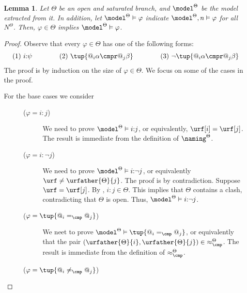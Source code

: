 \documentclass[10pt,a4paper]{amsart}
\newtheorem{lem}[thm]{Lemma}
\theoremstyle{definition}
\theoremstyle{remark}
\begin{document}
\begin{lem}\label{prop:truthlemma}
    Let $\Theta$ be an open and saturated branch, and $\model^{\Theta}$ be the model extracted from it. 
    In addition, let $\model^{\Theta} \vDash \varphi$ indicate $\model^{\Theta}, n \vDash \varphi$ for all $N^{\Theta}$.
    Then, $\varphi \in \Theta$ implies $\model^{\Theta} \vDash \varphi$.
\end{lem}
\begin{proof}
    Observe that every $\varphi \in \Theta$ has one of the following forms: 
    \[
        (1)~i{:}\psi \qquad\qquad
        (2)~\tup{@_i \alpha \cmpr @_j\beta } \qquad\qquad
        (3)~\lnot\tup{@_i \alpha \cmpr @_j\beta }
    \]
    The proof is by induction on the size of $\varphi \in \Theta$.
    We focus on some of the cases in the proof.
    \begin{description}
        \item[\textnormal{For the base cases we consider}] \hfill
            \begin{description}
                \item[($\varphi = i{:}j$)] 
                    We need to prove $\model^\Theta \vDash i{:}j$, or equivalently, $\urf[i] = \urf[j]$.
                    The result is immediate from the definition of $\naming^{\Theta}$.
                \item[($\varphi = i{:}\lnot j$)]
                    We need to prove $\model^\Theta \vDash i{:}\lnot j$, or equivalently $\urf \neq \urfather{\Theta}{j}$.
                    The proof is by contradiction.
                    Suppose $\urf = \urf[j]$.
                    By , $i{:}j \in \Theta$.
                    This implies that $\Theta$ contains a clash, contradicting that $\Theta$ is open. Thus, $\model^\Theta \vDash i{:}\lnot j$. 
                \item[($\varphi = \tup{@_i =_{\cmp} @_j}$)] 
                    We neet to prove $\model^\Theta \vDash \tup{@_i =_{\cmp} @_j}$, or equivalently that the pair ${(\urfather{\Theta}{i}, \urfather{\Theta}{j})} \in {\approx^{\Theta}_{\cmp}}$.
                    The result is immediate from the definition of ${\approx^{\Theta}_{\cmp}}$.
                \item[($\varphi = \tup{ @_i \neq_{\cmp} @_j}$)] 

\end{description}
\end{description}
\end{proof}
\end{document}
